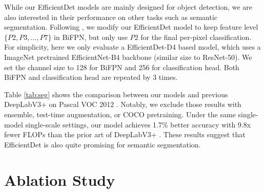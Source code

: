 \documentclass[10pt,twocolumn,letterpaper]{article}
\begin{document}
While our EfficientDet models are mainly designed for object detection, we are also interested in their performance on other tasks such as semantic segmentation. Following \cite{panopticfpn19}, we modify our EfficientDet model to keep feature level $\{P2, P3, ..., P7\}$ in BiFPN, but only use $P2$ for the final per-pixel classification. For simplicity, here we only evaluate a EfficientDet-D4 based model, which uses a ImageNet pretrained EfficientNet-B4 backbone (similar size to ResNet-50). We set the channel size to 128 for BiFPN and 256 for classification head. Both BiFPN and classification head are repeated by 3 times.


\begin{table}                                            
	\centering   	
	\caption{                                                                         
	\textbf{Performance comparison on Pascal VOC semantic segmentation}.
   }
   \vskip -0.1in
	\label{tab:seg}
\end{table} 
 
Table \ref{tab:seg} shows the comparison between our models and previous DeepLabV3+ \cite{deeplabv3plus14} on Pascal VOC 2012 \cite{pascalvoc12}. Notably, we exclude those results with ensemble,  test-time augmentation, or COCO pretraining. Under the same single-model single-scale settings, our model achieves 1.7\% better accuracy with 9.8x fewer FLOPs than the prior art of DeepLabV3+ \cite{deeplabv3plus14}. These results suggest that EfficientDet is also quite promising for semantic segmentation.



\section{Ablation Study}
\label{sec:ablation}
\end{document}
